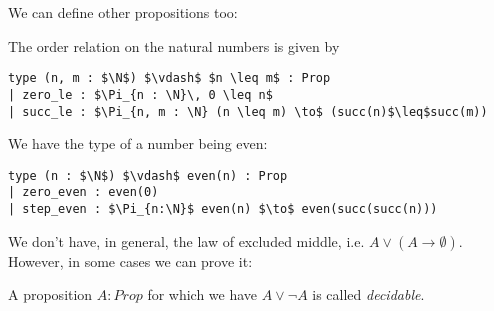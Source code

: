 \documentclass[a4paper, 12pt]{article}
\newcommand{\N}{\mathbb{N}}
\newcommand{\B}{\mathbb{B}}
\newcommand{\Prop}{\mathit{Prop}}
\renewcommand{\Prop}{\mathit{Prop}}
\newcommand{\la}[1]{\lambda{#1}.\,}
\theoremstyle{changedot}
\theoremstyle{changedotbreak}
\theoremstyle{nonumberplain}
\newtheorem{proof}{Proof}
\begin{document}
We can define other propositions too:

\begin{definition}
  The order relation on the natural numbers is given by
\begin{lstlisting}
type (n, m : $\N$) $\vdash$ $n \leq m$ : Prop
| zero_le : $\Pi_{n : \N}\, 0 \leq n$
| succ_le : $\Pi_{n, m : \N} (n \leq m) \to$ (succ(n)$\leq$succ(m))
\end{lstlisting}
\end{definition}

\begin{definition}
  We have the type of a number being even:
\begin{lstlisting}
type (n : $\N$) $\vdash$ even(n) : Prop
| zero_even : even(0)
| step_even : $\Pi_{n:\N}$ even(n) $\to$ even(succ(succ(n)))
\end{lstlisting}
\end{definition}

We don't have, in general, the law of excluded middle, i.e. $A \lor (A \to \emptyset)$. However, in some cases we can prove it:
\begin{definition}
  A proposition $A : \Prop$ for which we have $A \lor \neg A$ is called \textit{decidable}.
\end{definition}


\end{document}

